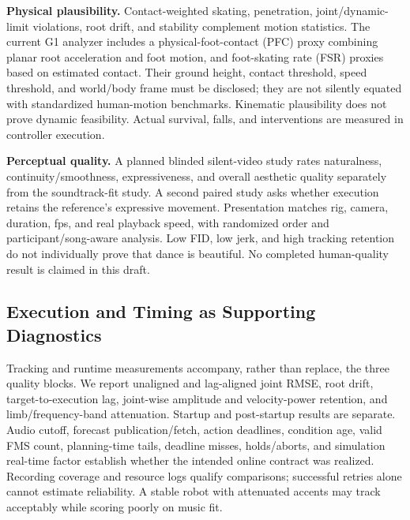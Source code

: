 \textbf{Physical plausibility.} Contact-weighted skating, penetration,
joint/dynamic-limit violations, root drift, and stability complement motion
statistics. The current G1 analyzer includes a physical-foot-contact (PFC)
proxy combining planar root acceleration and foot motion, and foot-skating
rate (FSR) proxies based on estimated contact. Their ground height, contact
threshold, speed threshold, and world/body frame must be disclosed; they are
not silently equated with standardized human-motion benchmarks. Kinematic
plausibility does not prove dynamic feasibility. Actual survival, falls, and
interventions are measured in controller execution.

\textbf{Perceptual quality.} A planned blinded silent-video study rates
naturalness, continuity/smoothness, expressiveness, and overall aesthetic
quality separately from the soundtrack-fit study. A second paired study asks
whether execution retains the reference's expressive movement. Presentation
matches rig, camera, duration, fps, and real playback speed, with randomized
order and participant/song-aware analysis. Low FID, low jerk, and high tracking
retention do not individually prove that dance is beautiful. No completed
human-quality result is claimed in this draft.

\subsection{Execution and Timing as Supporting Diagnostics}
Tracking and runtime measurements accompany, rather than replace, the three
quality blocks. We report unaligned and lag-aligned joint RMSE, root drift,
target-to-execution lag, joint-wise amplitude and velocity-power retention,
and limb/frequency-band attenuation. Startup and post-startup results are
separate. Audio cutoff, forecast publication/fetch, action deadlines, condition
age, valid FMS count, planning-time tails, deadline misses, holds/aborts, and
simulation real-time factor establish whether the intended online contract
was realized. Recording coverage and resource logs qualify comparisons;
successful retries alone cannot estimate reliability. A stable robot with
attenuated accents may track acceptably while scoring poorly on music fit.


